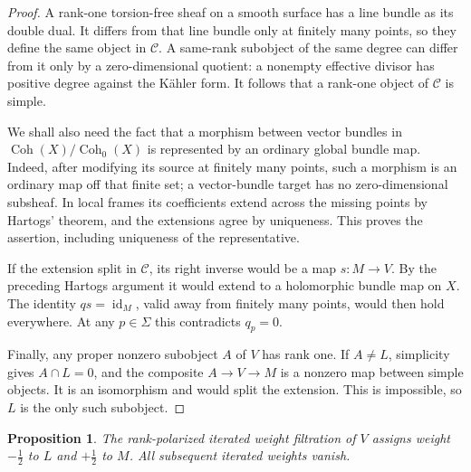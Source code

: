 \documentclass[11pt]{amsart}
\newtheorem{proposition}[theorem]{Proposition}
\theoremstyle{definition}
\theoremstyle{remark}
\newcommand{\Coh}{\operatorname{Coh}}
\newcommand{\id}{\operatorname{id}}
\begin{document}
\begin{proof}
A rank-one torsion-free sheaf on a smooth surface has a line bundle as its
double dual. It differs from that line bundle only at finitely many points,
so they define the same object in $\mathcal C$. A same-rank subobject of
the same degree can differ from it only by a zero-dimensional quotient:
a nonempty effective divisor has positive degree against the K\"ahler form.
It follows that a rank-one object of $\mathcal C$ is simple.

We shall also need the fact that a morphism between vector bundles in
$\Coh(X)/\Coh_0(X)$ is represented by an ordinary global bundle map.
Indeed, after modifying its source at finitely many points, such a morphism
is an ordinary map off that finite set; a vector-bundle target has no
zero-dimensional subsheaf. In local frames its coefficients extend across
the missing points by Hartogs' theorem, and the extensions agree by
uniqueness. This proves the assertion, including uniqueness of the
representative.

If the extension split in $\mathcal C$, its right inverse would be a map
$s:M\to V$. By the preceding Hartogs argument it would extend to a
holomorphic bundle map on $X$. The identity $qs=\id_M$, valid away from
finitely many points, would then hold everywhere. At any $p\in\Sigma$ this contradicts
$q_p=0$.

Finally, any proper nonzero subobject $A$ of $V$ has rank one. If
$A\ne L$, simplicity gives $A\cap L=0$, and the composite $A\to V\to M$
is a nonzero map between simple objects. It is an isomorphism and would
split the extension. This is impossible, so $L$ is the only such subobject.
\end{proof}

\begin{proposition}\label{prop:weights}
The rank-polarized iterated weight filtration of $V$ assigns weight
$-\tfrac12$ to $L$ and $+\tfrac12$ to $M$. All subsequent iterated
weights vanish.
\end{proposition}
\end{document}
